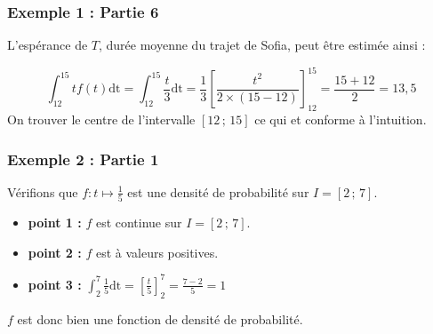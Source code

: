 \documentclass[xcolor=svgnames,t,final]{beamer}
\newcommand{\Interff}[2]{\left[#1\, ;\, #2\right]}
\begin{document}
\begin{frame}

\frametitle{Exemple 1 : Partie 6}






L'espérance de $T$, durée moyenne du trajet de Sofia, peut être estimée ainsi : 

\pause			\begin{equation*}
\int_{12}^{15}tf(t)\text{dt}=\int_{12}^{15}\frac{t}{3}\text{dt}=\frac{1}{3}\left[\frac{t^{2}}{2 \times (15-12)}\right]_{12}^{15}=\frac{15+12}{2} = 13,5 
		\end{equation*}
On trouver le centre de l'intervalle $\Interff{12}{15}$ ce qui et conforme à l'intuition.



\end{frame}

\begin{frame}

\frametitle{Exemple 2 : Partie 1}

Vérifions que $f: t \mapsto \frac{1}{5}$ est une densité de probabilité sur $I=\Interff{2}{7}$.

\begin{itemize}
\pause \item \textbf{point 1 :} $f$ est continue sur $I=\Interff{2}{7}$.



\pause \item \textbf{point 2 :} $f$ est à valeurs positives.

\pause \item \textbf{point 3 :} $\int_{2}^{7}\frac{1}{5}\text{dt} = \left[\frac{t}{5}  \right]_{2}^{7}=\frac{7-2}{5}=1$

\end{itemize}

$f$ est donc bien une fonction de densité de probabilité.


\end{frame}
\end{document}
